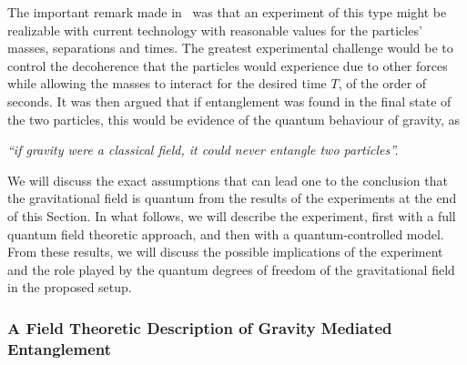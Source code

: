 \documentclass[letterpaper,12pt,titlepage,oneside,final]{book}
\begin{document}
The important remark made in~\cite{B,MV} was that an experiment of this type might be realizable with current technology with reasonable values for the particles' masses, separations and times. The greatest experimental challenge would be to control the decoherence that the particles would experience due to other forces while allowing the masses to interact for the desired time $T$, of the order of seconds. It was then argued that if entanglement was found in the final state of the two particles, this would be evidence of the quantum behaviour of gravity, as

\begin{center}
\textit{``if gravity were a classical field, it could never entangle two particles''.}
\end{center}
\noindent We will discuss the exact assumptions that can lead one to the conclusion that the gravitational field is quantum from the results of the experiments at the end of this Section. In what follows, we will describe the experiment, first with a full quantum field theoretic approach, and then with a quantum-controlled model. From these results, we will discuss the possible implications of the experiment and the role played by the quantum degrees of freedom of the gravitational field in the proposed setup.




\subsubsection*{A Field Theoretic Description of Gravity Mediated Entanglement}
\end{document}

